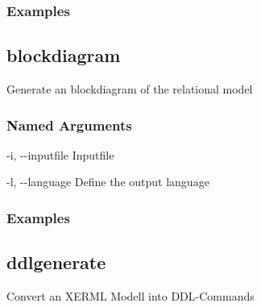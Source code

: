 \documentclass[letterpaper,10pt,english,openany,oneside]{sphinxmanual}
\begin{document}
\subsubsection{Examples}
\begin{sphinxVerbatim}[commandchars=\\\{\}]
       
\end{sphinxVerbatim}

\subsection{blockdiagram}
\label{\detokenize{cmd_main:blockdiagram}}
Generate an blockdiagram of the relational model

\begin{sphinxVerbatim}[commandchars=\\\{\}]
  \PYG{p}{[}\PYG{p}{]} \PYG{p}{[} \PYG{p}{]} \PYG{p}{[} \PYG{p}{]}
\end{sphinxVerbatim}


\subsubsection{Named Arguments}
\label{\detokenize{cmd_main:Named Arguments_repeat6}}\begin{optionlist}{3cm}
\item [-i, -{-}inputfile]  
Inputfile
\item [-l, -{-}language]  
Define the output language
\end{optionlist}

\subsubsection{Examples}
\begin{sphinxVerbatim}[commandchars=\\\{\}]
     
\end{sphinxVerbatim}

\subsection{ddlgenerate}
\label{\detokenize{cmd_main:ddlgenerate}}
Convert an XERML Modell into DDL-Commands
\end{document}
